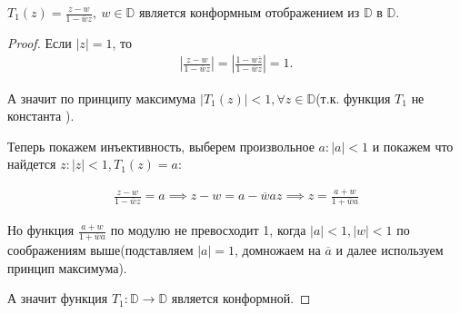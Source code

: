 \documentclass[../complex-analysis.tex]{subfiles}
\begin{document}
\begin{exercise}
	\label{exercise:T1_conformal}
	$T_1(z) = \frac{z - w}{1 - \overline w z}, \ w \in \mathbb D$ является конформным отображением из $\mathbb D$ в $\mathbb D$. 
\end{exercise}
\begin{proof}
	Если $|z| = 1$, то
	\begin{align*}
		\left|\frac{z - w}{1 - \overline w z}\right| = \left|\frac{1 - w \overline z}{1 - \overline w z}\right| = 1.
	\end{align*}

	А значит по принципу максимума $|T_1(z)| < 1, \forall z \in \mathbb D$(т.к. функция $T_1$ не константа ). 

	Теперь покажем инъективность, выберем произвольное $a : |a| < 1$ и покажем что найдется $z : |z| < 1, T_1(z) = a$:

	\begin{align*}
		\frac{z - w}{1 - \overline w z} = a \implies z - w = a - \overline w a z \implies z = \frac{a + w}{1 + \overline w a}
	\end{align*}

	Но функция $\frac{a + w}{1 + \overline w a}$ по модулю не превосходит 1, когда $|a| < 1, |w| < 1$ по соображениям выше(подставляем $|a| = 1$, домножаем на $\overline a$ и далее используем принцип максимума).

	А значит функция $T_1: \mathbb D \to \mathbb D$ является конформной. 
\end{proof}
\end{document}
